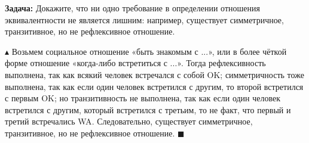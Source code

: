 \par \textbf{Задача:} Докажите, что ни одно требование в определении отношения эквивалентности не является лишним: например, существует симметричное, транзитивное, но не рефлексивное отношение.
\par $\blacktriangle$ Возьмем социальное отношение «быть знакомым с ...», или в более чёткой форме отношение «когда-либо встретиться с ...». Тогда рефлексивность выполнена, так как всякий человек встречался с собой {\color{ForestGreen}OK}; симметричность тоже выполнена, так как если один человек встретился с другим, то второй встретился с первым {\color{ForestGreen}OK}; но транзитивность не выполнена, так как  если один человек встретился с другим, который встретился с третьим, то не факт, что первый и третий встречались {\color{Red}WA}. Следовательно, существует симметричное, транзитивное, но не рефлексивное отношение. $\blacksquare$

